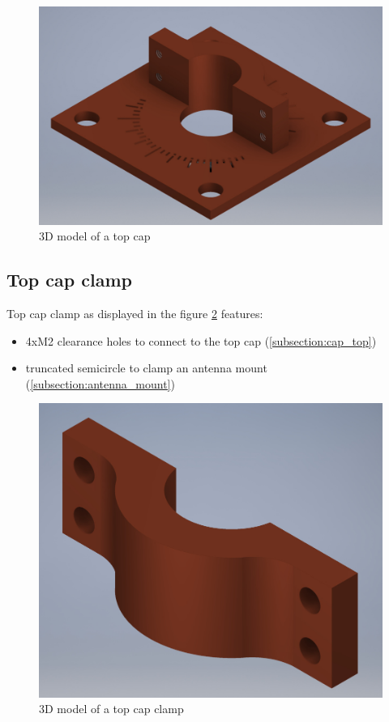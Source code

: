 \begin{figure}[h]
	\centering
	\includegraphics[width=\textwidth]{images/cap_top_small}
	\caption{3D model of a top cap}
	\label{fig:cap_top}
\end{figure}

\clearpage
\subsection{Top cap clamp}
\label{subsection:cap_top_clamp}
Top cap clamp as displayed in the figure \ref{fig:cap_top_clamp} features:
\begin{itemize}
	\item 4xM2 clearance holes to connect to the top cap (\ref{subsection:cap_top})
	\item truncated semicircle to clamp an antenna mount (\ref{subsection:antenna_mount})
\end{itemize}

\begin{figure}[h]
	\centering
	\includegraphics[width=\textwidth]{images/cap_top_movable_small}
	\caption{3D model of a top cap clamp}
	\label{fig:cap_top_clamp}
\end{figure}

